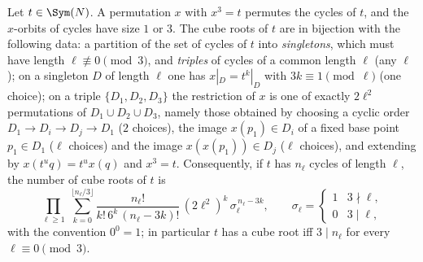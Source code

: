 
\begin{lem}\label{lem:cuberoots}
Let $t\in\Sym(N)$. A permutation $x$ with $x^{3}=t$ permutes the cycles of $t$, and the $x$-orbits of cycles have size $1$ or $3$. The cube roots of $t$ are in bijection with the following data:
a partition of the set of cycles of $t$ into \emph{singletons}, which must have length $\ell\not\equiv0\pmod 3$, and \emph{triples} of cycles of a common length $\ell$ (any $\ell$);
on a singleton $D$ of length $\ell$ one has $x|_{D}=t^{k}|_{D}$ with $3k\equiv1\pmod\ell$ (one choice);
on a triple $\{D_1,D_2,D_3\}$ the restriction of $x$ is one of exactly $2\ell^{2}$ permutations of $D_1\cup D_2\cup D_3$, namely those obtained by choosing a cyclic order $D_{1}\to D_{i}\to D_{j}\to D_{1}$ ($2$ choices), the image $x(p_1)\in D_i$ of a fixed base point $p_1\in D_1$ ($\ell$ choices) and the image $x(x(p_1))\in D_j$ ($\ell$ choices), and extending by $x(t^{u}q)=t^{u}x(q)$ and $x^{3}=t$.
Consequently, if $t$ has $n_\ell$ cycles of length $\ell$, the number of cube roots of $t$ is
\begin{equation}\label{eq:cuberootcount}
\prod_{\ell\ge1}\ \sum_{k=0}^{\lfloor n_\ell/3\rfloor}\frac{n_\ell!}{k!\,6^{k}\,(n_\ell-3k)!}\,(2\ell^{2})^{k}\,\sigma_\ell^{\,n_\ell-3k},
\qquad \sigma_\ell=\begin{cases}1&3\nmid\ell,\\0&3\mid\ell,\end{cases}
\end{equation}
with the convention $0^{0}=1$; in particular $t$ has a cube root iff $3\mid n_\ell$ for every $\ell\equiv0\pmod 3$.
\end{lem}
